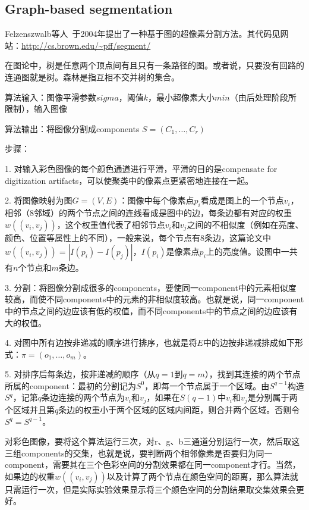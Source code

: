 \documentclass[12pt]{article}
\begin{document}
\subsection{Graph-based segmentation}

Felzenszwalb等人~\cite{felzenszwalb2004efficient}于2004年提出了一种基于图的超像素分割方法。其代码见网站：\url{http://cs.brown.edu/~pff/segment/}

在图论中，树是任意两个顶点间有且只有一条路径的图。或者说，只要没有回路的连通图就是树。森林是指互相不交并树的集合。

算法输入：图像平滑参数$sigma$，阈值$k$，最小超像素大小$min$（由后处理阶段所限制），输入图像

算法输出：将图像分割成components $S = (C_1, \ldots, C_r)$

步骤：

1. 对输入彩色图像的每个颜色通道进行平滑，平滑的目的是compensate for digitization artifacts，可以使聚类中的像素点更紧密地连接在一起。

2. 将图像映射为图$G = (V, E)$：图像中每个像素点$p_i$看成是图上的一个节点$v_i$，相邻（8邻域）的两个节点之间的连线看成是图中的边，每条边都有对应的权重$w((v_i, v_j))$，这个权重值代表了相邻节点$v_i$和$v_j$之间的不相似度（例如在亮度、颜色、位置等属性上的不同），一般来说，每个节点有8条边，这篇论文中$w((v_i, v_j)) = |I(p_i)-I(p_j)|$，$I(p_i)$是像素点$p_i$上的亮度值。设图中一共有$n$个节点和$m$条边。

3. 分割：将图像分割成很多的components，要使同一component中的元素相似度较高，而使不同components中的元素的非相似度较高。也就是说，同一component中的节点之间的边应该有低的权值，而不同components中的节点之间的边应该有大的权值。

4. 对图中所有边按非递减的顺序进行排序，也就是将$E$中的边按非递减排成如下形式：$\pi = (o_1, \ldots, o_m)$。

5. 对排序后每条边，按非递减的顺序（从$q=1$到$q=m$），找到其连接的两个节点所属的component：最初的分割记为$S^0$，即每一个节点属于一个区域。由$S^{q-1}$构造$S^q$，记第$q$条边连接的两个节点为$v_i$和$v_j$，如果在$S(q-1)$中$v_i$和$v_j$是分别属于两个区域并且第$q$条边的权重小于两个区域的区域内间距，则合并两个区域。否则令$S^q = S^{q-1}$。

对彩色图像，要将这个算法运行三次，对r、g、b三通道分别运行一次，然后取这三组components的交集，也就是说，要判断两个相邻像素是否要归为同一component，需要其在三个色彩空间的分割效果都在同一component才行。当然，如果边的权重$w((v_i, v_j))$以及计算了两个节点在颜色空间的距离，那么算法就只需运行一次，但是实际实验效果显示将三个颜色空间的分割结果取交集效果会更好。
\end{document}
